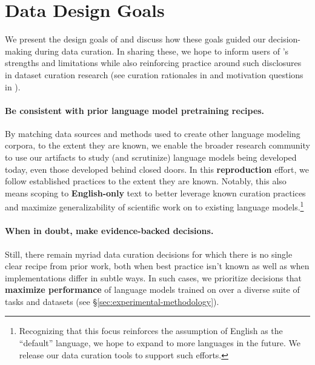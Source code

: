 \section{Data Design Goals}
\label{sec:desiderata}



We present the design goals of \dolma and discuss how these goals guided our decision-making during data curation.
In sharing these, we hope to inform users of \dolma's strengths and limitations while also reinforcing practice around such disclosures in dataset curation research (see curation rationales in \citet{bender-friedman-2018-data} and motivation questions in \citet{gebru2021datasheets}).










\paragraph{Be consistent with prior language model pretraining recipes.}
By matching data sources and methods used to create other language modeling corpora, to the extent they are known, we enable the broader research community to use our artifacts to 
study (and scrutinize) language models being developed today, even those developed behind closed doors.
In this \textbf{reproduction} effort, we follow established practices 
to the extent they are known.
Notably, this also means scoping \dolma to \textbf{English-only} text to better leverage known curation practices and maximize generalizability of scientific work on \dolma to existing language models.\footnote{Recognizing that this focus reinforces the assumption of English as the ``default'' language, we hope to expand \dolma to more languages in the future. We release our data curation tools to support such efforts.
}

\paragraph{When in doubt, make evidence-backed decisions.} Still, there remain myriad data curation decisions for which there is no single clear recipe from prior work, both when best practice isn't known as well as when implementations differ in subtle ways.
In such cases, we prioritize decisions that \textbf{maximize performance} of language models trained on \dolma over a diverse suite of tasks and datasets (see \S\ref{sec:experimental-methodology}).











